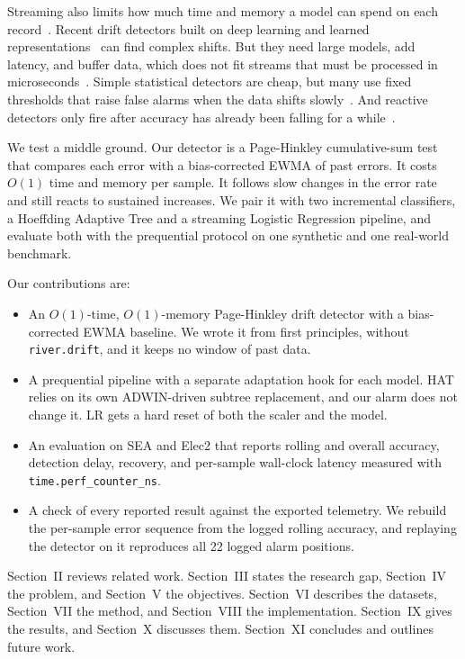 \documentclass[conference]{IEEEtran}
\begin{document}
Streaming also limits how much time and memory a model can spend on each record~\cite{wan2024}.
Recent drift detectors built on deep learning and learned representations~\cite{wan2024, chambers2023} can find complex shifts.
But they need large models, add latency, and buffer data, which does not fit streams that must be processed in microseconds~\cite{wan2024}.
Simple statistical detectors are cheap, but many use fixed thresholds that raise false alarms when the data shifts slowly~\cite{rum2026}.
And reactive detectors only fire after accuracy has already been falling for a while~\cite{cano2026}.

We test a middle ground.
Our detector is a Page-Hinkley cumulative-sum test that compares each error with a bias-corrected EWMA of past errors.
It costs $O(1)$ time and memory per sample.
It follows slow changes in the error rate and still reacts to sustained increases.
We pair it with two incremental classifiers, a Hoeffding Adaptive Tree and a streaming Logistic Regression pipeline, and evaluate both with the prequential protocol on one synthetic and one real-world benchmark.

Our contributions are:
\begin{itemize}
    \item An $O(1)$-time, $O(1)$-memory Page-Hinkley drift detector with a bias-corrected EWMA baseline. We wrote it from first principles, without \texttt{river.drift}, and it keeps no window of past data.
    \item A prequential pipeline with a separate adaptation hook for each model. HAT relies on its own ADWIN-driven subtree replacement, and our alarm does not change it. LR gets a hard reset of both the scaler and the model.
    \item An evaluation on SEA and Elec2 that reports rolling and overall accuracy, detection delay, recovery, and per-sample wall-clock latency measured with \texttt{time.perf\_counter\_ns}.
    \item A check of every reported result against the exported telemetry. We rebuild the per-sample error sequence from the logged rolling accuracy, and replaying the detector on it reproduces all 22 logged alarm positions.
\end{itemize}

Section~II reviews related work.
Section~III states the research gap, Section~IV the problem, and Section~V the objectives.
Section~VI describes the datasets, Section~VII the method, and Section~VIII the implementation.
Section~IX gives the results, and Section~X discusses them.
Section~XI concludes and outlines future work.
\end{document}
